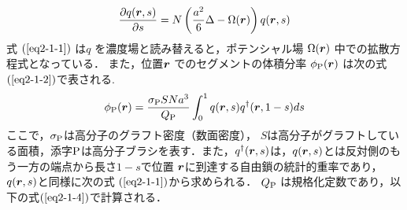 \documentclass[10.5pt,a4j]{jarticle}
\newcommand{\bvec}[1]{
\mbox{\boldmath $#1$}
}%
\begin{document}
%
%
\begin{equation}
        \label{eq2-1-1}
        \frac{\partial q( \bvec{r},s )}{\partial s}
        =N
        \left(
            \frac{a^2}{6}\Delta-\Omega(\bvec{r})
        \right)
        q( \bvec{r},s )\\
        \end{equation}
%
%
式 $ (\ref{eq2-1-1}) $ は$ q $ を濃度場と読み替えると，ポテンシャル場 $ \Omega(\bvec{r}) $ 中での拡散方程式となっている．
また，位置$  \bvec{r} $ でのセグメントの体積分率 $ \phi_{\rm{P}}( \bvec{r} ) $ は次の式 $ (\ref{eq2-1-2}) $で表される.
%
%
\begin{equation}
\label{eq2-1-2}
\phi_{\rm{P}}( \bvec{r} )=\frac{\sigma_{\rm{P}}SNa^3}{Q_{\rm{P}}}
\int_{0}^{1} q( \bvec{r},s )q^{\dag}( \bvec{r},1-s ) ds
\end{equation}
%
%
%
%
ここで，$\sigma_{\rm{P}}$は高分子のグラフト密度（数面密度），
$S$は高分子がグラフトしている面積，添字$\rm{P}$は高分子ブラシを表す．また，$ q^{\dag}( \bvec{r},s ) $は，$ q( \bvec{r},s )$とは反対側のもう一方の端点から長さ$1-s$で位置 $  \bvec{r} $に到達する自由鎖の統計的重率であり，$ q( \bvec{r},s ) $と同様に次の式 $ (\ref{eq2-1-1}) $から求められる．
%
$ Q_{\rm{P}} $ は規格化定数であり，以下の式$(\ref{eq2-1-4})$で計算される．
\end{document}
